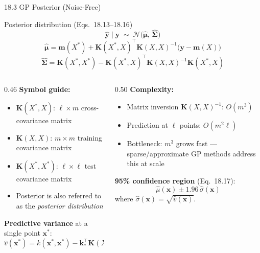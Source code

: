 \documentclass[aspectratio=169,10pt]{beamer}
\newcommand{\bx}{\mathbf{x}}
\newcommand{\bmu}{\boldsymbol{\mu}}
\newcommand{\bSigma}{\boldsymbol{\Sigma}}
\newcommand{\Norm}{\mathcal{N}}
\newcommand{\KXX}{\mathbf{K}(X,X)}
\newcommand{\KXs}{\mathbf{K}(X^*,X)}
\newcommand{\Kss}{\mathbf{K}(X^*,X^*)}
\begin{document}
\begin{frame}{18.3 GP Posterior (Noise-Free)}
  \begin{block}{Posterior distribution (Eqs.\ 18.13--18.16)}
    \[
      \hat{\mathbf{y}} \mid \mathbf{y}
      \;\sim\; \Norm\!\bigl(\hat{\bmu},\, \hat{\bSigma}\bigr)
    \]
    \[
      \hat{\bmu}    = \mathbf{m}(X^*) +
                      \KXs^\top \KXX^{-1}\bigl(\mathbf{y}-\mathbf{m}(X)\bigr)
    \]
    \[
      \hat{\bSigma} = \Kss - \KXs^\top \KXX^{-1} \KXs
    \]
  \end{block}
  \vspace{0.2em}
  \begin{columns}[T]
    \begin{column}{0.46\textwidth}
      \textbf{Symbol guide:}
      \begin{itemize}
        \item $\mathbf{K}(X^*,X)$: $\ell\times m$ cross-covariance matrix
        \item $\mathbf{K}(X,X)$: $m\times m$ training covariance matrix
        \item $\mathbf{K}(X^*,X^*)$: $\ell\times\ell$ test covariance matrix
        \item Posterior is also referred to as the \emph{posterior distribution}
      \end{itemize}
      \vspace{0.3em}
      \textbf{Predictive variance} at a single point $\bx^*$:
      \[
        \hat{v}(\bx^*) = k(\bx^*,\bx^*) - \mathbf{k}_{*}^\top \KXX^{-1} \mathbf{k}_{*}
      \]
    \end{column}
    \begin{column}{0.50\textwidth}
      \textbf{Complexity:}
      \begin{itemize}
        \item Matrix inversion $\KXX^{-1}$: $O(m^3)$
        \item Prediction at $\ell$ points: $O(m^2 \ell)$
        \item Bottleneck: $m^3$ grows fast --- sparse/approximate GP methods
              address this at scale
      \end{itemize}
      \vspace{0.3em}
      \textbf{95\% confidence region} (Eq.\ 18.17):
      \[
        \hat{\mu}(\bx) \pm 1.96\,\hat{\sigma}(\bx)
      \]
      where $\hat{\sigma}(\bx)=\sqrt{\hat{v}(\bx)}$.
    \end{column}
  \end{columns}
\end{frame}
\end{document}
